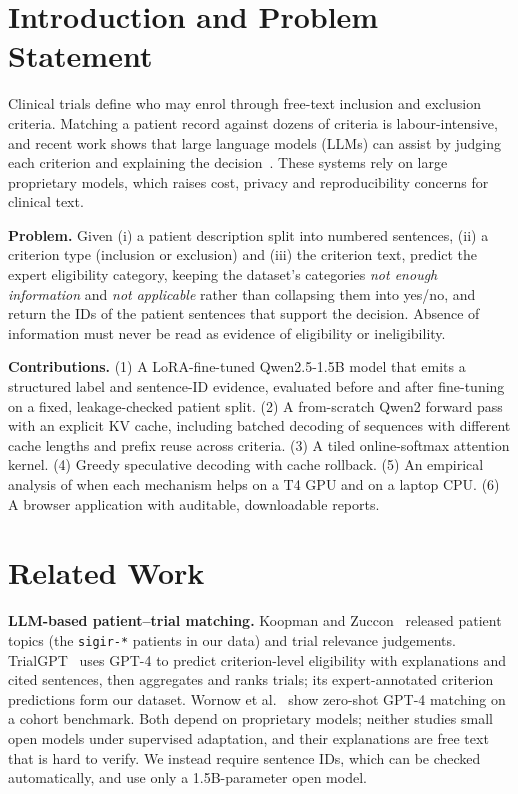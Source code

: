 \documentclass[conference]{IEEEtran}
\newcommand{\code}[1]{\texttt{\small #1}}
\begin{document}
\section{Introduction and Problem Statement}
Clinical trials define who may enrol through free-text inclusion and exclusion criteria. Matching a patient record against dozens of criteria is labour-intensive, and recent work shows that large language models (LLMs) can assist by judging each criterion and explaining the decision~\cite{jin2024trialgpt,wornow2024zeroshot}. These systems rely on large proprietary models, which raises cost, privacy and reproducibility concerns for clinical text.

\textbf{Problem.} Given (i) a patient description split into numbered sentences, (ii) a criterion type (inclusion or exclusion) and (iii) the criterion text, predict the expert eligibility category, keeping the dataset's categories \emph{not enough information} and \emph{not applicable} rather than collapsing them into yes/no, and return the IDs of the patient sentences that support the decision. Absence of information must never be read as evidence of eligibility or ineligibility.

\textbf{Contributions.} (1) A LoRA-fine-tuned Qwen2.5-1.5B model that emits a structured label and sentence-ID evidence, evaluated before and after fine-tuning on a fixed, leakage-checked patient split. (2) A from-scratch Qwen2 forward pass with an explicit KV cache, including batched decoding of sequences with different cache lengths and prefix reuse across criteria. (3) A tiled online-softmax attention kernel. (4) Greedy speculative decoding with cache rollback. (5) An empirical analysis of when each mechanism helps on a T4 GPU and on a laptop CPU. (6) A browser application with auditable, downloadable reports.

\section{Related Work}
\textbf{LLM-based patient--trial matching.} Koopman and Zuccon~\cite{koopman2016test} released patient topics (the \code{sigir-*} patients in our data) and trial relevance judgements. TrialGPT~\cite{jin2024trialgpt} uses GPT-4 to predict criterion-level eligibility with explanations and cited sentences, then aggregates and ranks trials; its expert-annotated criterion predictions form our dataset. Wornow et al.~\cite{wornow2024zeroshot} show zero-shot GPT-4 matching on a cohort benchmark. Both depend on proprietary models; neither studies small open models under supervised adaptation, and their explanations are free text that is hard to verify. We instead require sentence IDs, which can be checked automatically, and use only a 1.5B-parameter open model.
\end{document}
